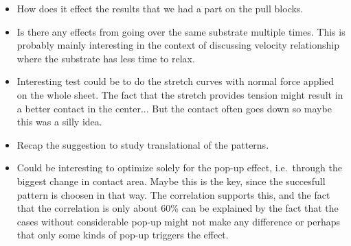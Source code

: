 \begin{itemize}
  \item How does it effect the results that we had a part on the pull blocks. 
  \item Is there any effects from going over the same substrate multiple times. This is probably mainly interesting in the context of discussing velocity relationship where the substrate has less time to relax.
  \item Interesting test could be to do the stretch curves with normal force applied on the whole sheet. The fact that the stretch provides tension might result in a better contact in the center... But the contact often goes down so maybe this was a silly idea.
  \item Recap the suggestion to study translational of the patterns.
  \item Could be interesting to optimize solely for the pop-up effect, i.e.\ through the biggest change in contact area. Maybe this is the key, since the succesfull pattern is choosen in that way. The correlation supports this, and the fact that the correlation is only about 60\% can be explained by the fact that the cases without considerable pop-up might not make any difference or perhaps that only some kinds of pop-up triggers the effect. 
\end{itemize}



